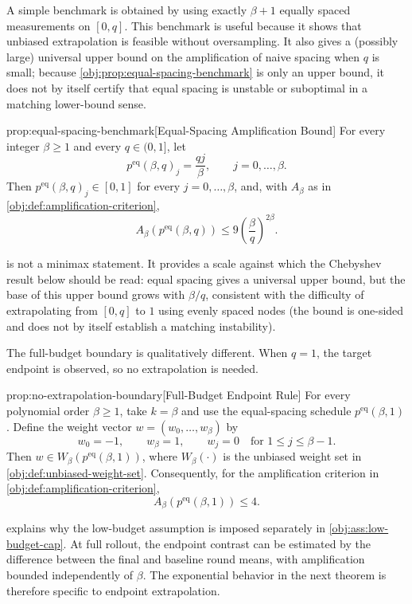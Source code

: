 A simple benchmark is obtained by using exactly \(\beta+1\) equally spaced measurements on \([0,q]\). This benchmark is useful because it shows that unbiased extrapolation is feasible without oversampling. It also gives a (possibly large) universal upper bound on the amplification of naive spacing when \(q\) is small; because \cref{obj:prop:equal-spacing-benchmark} is only an upper bound, it does not by itself certify that equal spacing is unstable or suboptimal in a matching lower-bound sense.

\begin{propositionv}{prop:equal-spacing-benchmark}[Equal-Spacing Amplification Bound]
For every integer $\beta\ge 1$ and every $q\in(0,1]$, let
\[
p^{\mathrm{eq}}(\beta,q)_j=\frac{qj}{\beta},
\qquad j=0,\ldots,\beta .
\]
Then $p^{\mathrm{eq}}(\beta,q)_j\in[0,1]$ for every $j=0,\ldots,\beta$, and, with $A_\beta$ as in \cref{obj:def:amplification-criterion},
\[
A_\beta\!\left(p^{\mathrm{eq}}(\beta,q)\right)
\le
9\left(\frac{\beta}{q}\right)^{2\beta}.
\]
\end{propositionv}

 is not a minimax statement. It provides a scale against which the Chebyshev result below should be read: equal spacing gives a universal upper bound, but the base of this upper bound grows with \(\beta/q\), consistent with the difficulty of extrapolating from \([0,q]\) to \(1\) using evenly spaced nodes (the bound is one-sided and does not by itself establish a matching instability).

The full-budget boundary is qualitatively different. When \(q=1\), the target endpoint is observed, so no extrapolation is needed.

\begin{propositionv}{prop:no-extrapolation-boundary}[Full-Budget Endpoint Rule]
For every polynomial order \(\beta\ge 1\), take \(k=\beta\) and use the equal-spacing schedule \(p^{\mathrm{eq}}(\beta,1)\). Define the weight vector \(w=(w_0,\ldots,w_\beta)\) by
\[
w_0=-1,\qquad w_\beta=1,\qquad w_j=0 \quad\text{for } 1\le j\le \beta-1 .
\]
Then \(w\in W_\beta(p^{\mathrm{eq}}(\beta,1))\), where \(W_\beta(\cdot)\) is the unbiased weight set in \cref{obj:def:unbiased-weight-set}. Consequently, for the amplification criterion in \cref{obj:def:amplification-criterion},
\[
A_\beta\!\left(p^{\mathrm{eq}}(\beta,1)\right)\le 4 .
\]
\end{propositionv}

 explains why the low-budget assumption is imposed separately in \cref{obj:ass:low-budget-cap}. At full rollout, the endpoint contrast can be estimated by the difference between the final and baseline round means, with amplification bounded independently of \(\beta\). The exponential behavior in the next theorem is therefore specific to endpoint extrapolation.

